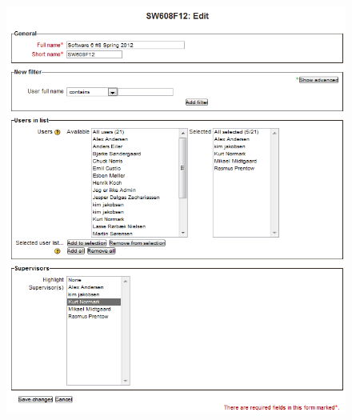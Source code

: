 \begin{figure}
	\centering
		\includegraphics[width=\textwidth]{images/moodleprojecgroupedit.png}

		\label{fig:moodlcgroupedit}
\end{figure}
\FloatBarrier